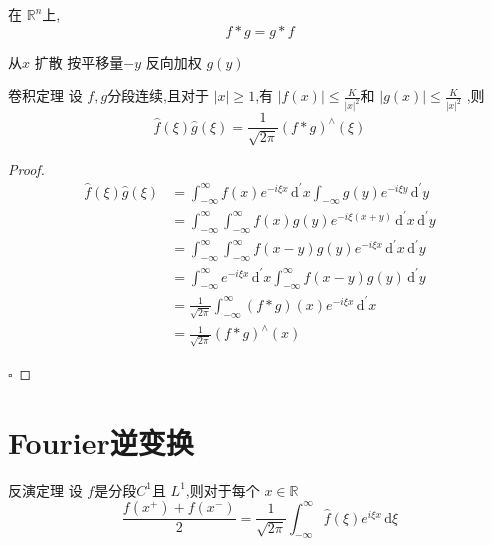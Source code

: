 \documentclass[../../main.tex]{subfiles}
\begin{document}
\begin{proposition}
    在 \(  \mathbb{R} ^{n}  \)上, \[
    f*g = g *f
    \] 
\end{proposition}
\begin{note}
    从\(  x  \) 扩散 按平移量\(  -y  \) 反向加权 \(  g\left( y \right)   \) 
\end{note}
\begin{theorem}{卷积定理}
    设 \(  f,g  \)分段连续,且对于 \(  \left| x \right|\ge 1   \),有 \(  \left| f\left( x \right)  \right|\le \frac{K }{\left| x \right|^{2}  }    \)和 \(  \left| g\left( x \right)  \right|\le \frac{K }{\left| x \right|^{2}  }    \)    ,则 \[
    \hat{f}\left(  \xi  \right)\hat{g}\left(  \xi  \right)= \frac{1 }{\sqrt{2\pi } } \left( f*g \right)^{\wedge }\left(  \xi  \right)     
    \]
\end{theorem}
\begin{proof}
    \[
    \begin{aligned}
    \hat{f}\left(  \xi  \right)\hat{g}\left(  \xi  \right)&= \int_{-\infty}^{\infty} f\left( x \right)    e^{-i \xi x}\,\mathrm{d} ^{\prime} x \int_{-\infty}g\left( y \right)e^{-i \xi y}\,\mathrm{d} ^{\prime} y\\ 
     &= \int_{-\infty}^{\infty}\int_{-\infty}^{\infty}f\left( x \right)g\left( y \right)e^{-i \xi \left( x+ y \right) }\,\mathrm{d} ^{\prime} x\,\mathrm{d} ^{\prime} y   \\ 
      &= \int_{-\infty}^{\infty}\int_{-\infty}^{\infty}f\left( x-y \right)g\left( y \right)e^{-i \xi x}\,\mathrm{d} ^{\prime} x\,\mathrm{d} ^{\prime} y\\ 
       &= \int_{-\infty}^{\infty}e^{-i \xi x}\,\mathrm{d} ^{\prime} x \int_{-\infty}^{\infty}f\left( x-y \right)g\left( y \right)\,\mathrm{d} ^{\prime} y  \\ 
        &= \frac{1 }{\sqrt{2\pi } } \int_{-\infty}^{\infty}\left( f*g \right)\left(  x  \right)e^{-i \xi x}\,\mathrm{d} ^{\prime} x \\ 
         &= \frac{1 }{\sqrt{2\pi }  } \left( f*g \right)    ^{\wedge }\left( x \right) 
    \end{aligned}
    \]

    \hfill $\square$
\end{proof}

\section{Fourier逆变换}

\begin{theorem}{反演定理}
    设 \(  f  \)是分段\(  C^{1}  \)且 \(  L^{1}  \),则对于每个 \(  x \in \mathbb{R}   \) \[
    \frac{f\left( x^{+ } \right)+ f\left( x^{-} \right)   }{2 }= \frac{1 }{\sqrt{2\pi } }\int_{-\infty}^{\infty}\hat{f}\left(  \xi  \right)e^{i \xi x}\,\mathrm{d}  \xi    
    \]     
\end{theorem}
\end{document}
